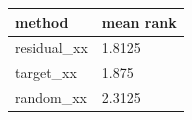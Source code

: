 \begin{tabular}{ll}
\toprule
method & mean rank \\
\midrule
residual\_xx & 1.8125 \\
target\_xx & 1.875 \\
random\_xx & 2.3125 \\
\bottomrule
\end{tabular}
